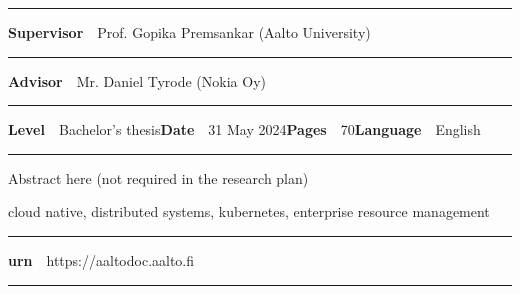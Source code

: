 \begin{spacing}{.88}
{\vspace{-2.4mm}\rule{\textwidth}{.75pt}

{\fontsize{10.5pt}{10.5pt}\bfseries\sffamily\lsstyle Supervisor}~~{\small Prof. Gopika Premsankar (Aalto University)}

\vspace{-2.4mm}\rule{\textwidth}{.75pt}

{\fontsize{10.5pt}{10.5pt}\bfseries\sffamily\lsstyle Advisor}~~{\small Mr. Daniel Tyrode (Nokia Oy)}

\vspace{-2.4mm}\rule{\textwidth}{.75pt}

{\fontsize{10.5pt}{10.5pt}\bfseries\sffamily\lsstyle Level}~~{\small Bachelor's thesis}\hfill{\fontsize{10.5pt}{10.5pt}\bfseries\sffamily\lsstyle Date}~~{\small 31 May 2024}\hfill{\fontsize{10.5pt}{10.5pt}\bfseries\sffamily\lsstyle Pages}~~{\small 70}\hfill{\fontsize{10.5pt}{10.5pt}\bfseries\sffamily\lsstyle Language}~~{\small English}

\vspace{-2.4mm}\rule{\textwidth}{.75pt}

\vspace{6mm}

} %
\end{spacing}
\begin{spacing}{1.05}

\vspace{.8mm}

{\small
  Abstract here (not required in the research plan)
}

\vfill

\end{spacing}
\begin{spacing}{.88}
{\parindent0pt %

\parbox[t]{123.6mm}{\raggedright\small cloud native, distributed systems, kubernetes, enterprise resource management}

\vspace{.5mm}\rule{\textwidth}{.75pt}

{\fontsize{10.5pt}{10.5pt}\bfseries\sffamily\lsstyle urn}~~{\small https://aaltodoc.aalto.fi}

\vspace{-2.4mm}\rule{\textwidth}{.75pt}

} %
\end{spacing}



